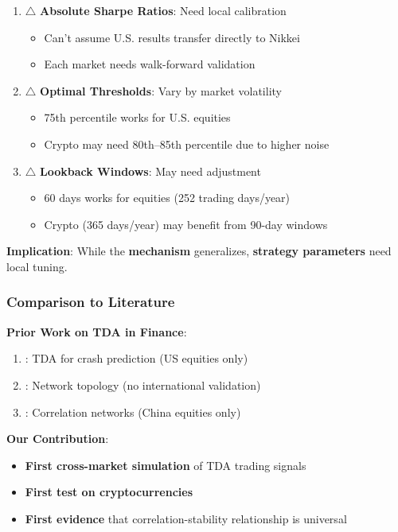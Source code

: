 \begin{enumerate}
\item $\triangle$ \textbf{Absolute Sharpe Ratios}: Need local calibration
   \begin{itemize}
   \item Can't assume U.S. results transfer directly to Nikkei
   \item Each market needs walk-forward validation
   \end{itemize}

\item $\triangle$ \textbf{Optimal Thresholds}: Vary by market volatility
   \begin{itemize}
   \item 75th percentile works for U.S. equities
   \item Crypto may need 80th--85th percentile due to higher noise
   \end{itemize}

\item $\triangle$ \textbf{Lookback Windows}: May need adjustment
   \begin{itemize}
   \item 60 days works for equities (252 trading days/year)
   \item Crypto (365 days/year) may benefit from 90-day windows
   \end{itemize}
\end{enumerate}

\textbf{Implication}: While the \textbf{mechanism} generalizes, \textbf{strategy parameters} need local tuning.

\subsubsection{Comparison to Literature}

\textbf{Prior Work on TDA in Finance}:
\begin{enumerate}
\item \citet{Gidea2018}: TDA for crash prediction (US equities only)
\item \citet{Yen2012}: Network topology (no international validation)
\item \citet{Meng2021}: Correlation networks (China equities only)
\end{enumerate}

\textbf{Our Contribution}:
\begin{itemize}
\item \textbf{First cross-market simulation} of TDA trading signals
\item \textbf{First test on cryptocurrencies}
\item \textbf{First evidence} that correlation-stability relationship is universal
\end{itemize}

